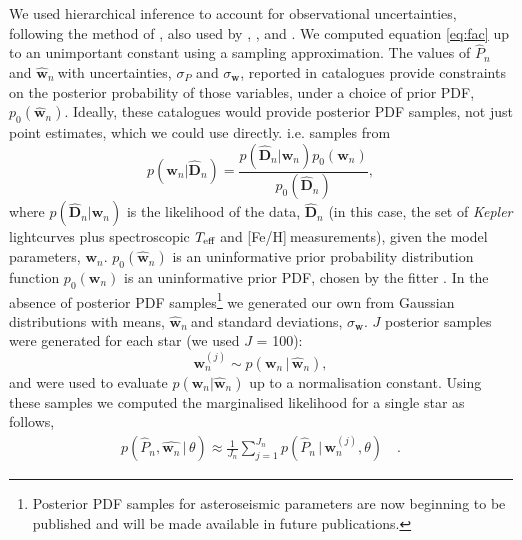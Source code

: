 \documentclass[useAMS, usenatbib]{mn2e}
\newcommand{\logg}{log \emph{g}}
\newcommand{\teff}{$T_{\rm{eff}}$}
\newcommand{\w}{\mathbf{w}}
\newcommand{\wh}{$\hat{\mathbf{w}}_n$}
\newcommand{\ph}{$\hat{P}_n$}
\newcommand{\feh}{[Fe/H]}
\begin{document}
We used hierarchical inference to account for observational uncertainties,
following the method of \citet{Hogg2010}, also used by
\citet{Foreman-Mackey2014}, \citet{Rogers2014}, \citet{Morton2014} and
\citet{Demory2014}.
We computed equation \ref{eq:fac} up to an unimportant constant
using a sampling approximation.
The values of \ph$~$and \wh$~$with uncertainties, $\sigma_P$ and
$\sigma_{\mathbf{w}}$, reported in catalogues provide constraints on the
posterior probability of those variables, under a choice of prior PDF,
$p_0(\hat{\mathbf{w}}_n)$.
Ideally, these catalogues would provide posterior PDF samples, not just point
estimates, which we could use directly.
i.e. samples from
\begin{equation}
	p(\mathbf{w}_n|\hat{\mathbf{D}}_n) =
	\frac{p(\hat{\mathbf{D}}_n|\mathbf{w}_n)p_0(\mathbf{w}_n)}
	{p_0(\hat{\mathbf{D}}_n)},
\end{equation}
where $p(\hat{\mathbf{D}}_n|\w_n)$ is the likelihood of the data,
$\hat{\mathbf{D}}_n$ (in this case,
the set of {\it Kepler} lightcurves plus spectroscopic \teff$~$and
\feh$~$measurements), given the model parameters, $\mathbf{w}_n$.
$p_0(\hat{\w}_n)$ is an uninformative prior probability distribution
function $p_0(\mathbf{w}_n)$ is an uninformative prior PDF, chosen by the
fitter \citep[][used a flat prior PDF in age and \logg]{Chaplin2014}.
In the absence of posterior PDF samples\footnote{Posterior PDF samples
for asteroseismic parameters are now beginning to be published and will be made
available in future publications.} we generated our own from Gaussian
distributions with means, \wh$~$and standard deviations, $\sigma_{\mathbf{w}}$.
$J$ posterior samples were generated for each star (we used $J$ = 100):
\begin{equation}
\w_n^{(j)} \sim p(\w_n\,|\,\hat{\w}_n),
\end{equation}
and were used to evaluate $p(\mathbf{w}_n|\hat{\mathbf{w}}_n)$ up to a
normalisation constant.
Using these samples we computed the marginalised likelihood for a single
star as follows,
\begin{align}
	p(\hat{P}_n,\hat{\w_n}\,|\,\theta) \approx \frac{1}{J_n}
	\sum_{j=1}^{J_n}p(\hat{P}_n\,|\,\mathbf{w}_n^{(j)},\theta) \quad.
\end{align}
\end{document}
